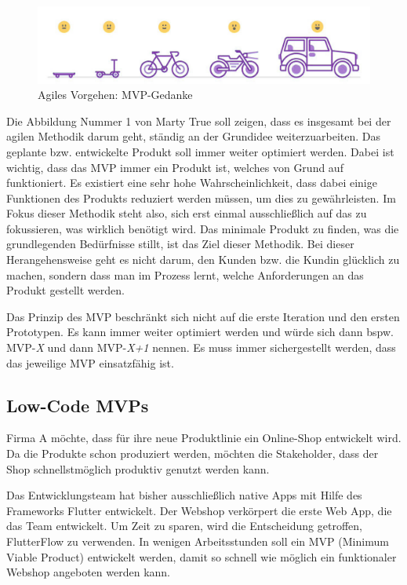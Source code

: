 \documentclass[acmtog, language=ngerman]{acmart}
\begin{document}
\begin{figure}[h]
    \centering
    \includegraphics[width=1\linewidth]{images/mvp_grafik.jpg}
    \caption{Agiles Vorgehen: MVP-Gedanke \cite{mvp_definition}}
    \label{fig:enter-label}
\end{figure}
Die Abbildung Nummer 1 von Marty True \cite{mvp_definition} soll zeigen, dass es insgesamt bei der agilen Methodik darum geht, ständig an der Grundidee weiterzuarbeiten. Das geplante bzw. entwickelte Produkt soll immer weiter optimiert werden.
Dabei ist wichtig, dass das MVP immer ein Produkt ist, welches von Grund auf funktioniert. Es existiert eine sehr hohe Wahrscheinlichkeit, dass dabei einige Funktionen des Produkts reduziert werden müssen, um dies zu gewährleisten.
Im Fokus dieser Methodik steht also, sich erst einmal ausschließlich auf das zu fokussieren, was wirklich benötigt wird. Das minimale Produkt zu finden, was die grundlegenden Bedürfnisse stillt, ist das Ziel dieser Methodik.
Bei dieser Herangehensweise geht es nicht darum, den Kunden bzw. die Kundin  glücklich zu machen, sondern dass man im Prozess lernt, welche Anforderungen an das Produkt gestellt werden.

Das Prinzip des MVP beschränkt sich nicht auf die erste Iteration und den ersten Prototypen. Es kann immer weiter optimiert werden und würde sich dann bspw. MVP-\textit{X} und dann MVP-\textit{X+1} nennen. Es muss immer sichergestellt werden, dass das jeweilige MVP einsatzfähig ist.

\subsection{Low-Code MVPs}

Firma A möchte, dass für ihre neue Produktlinie ein Online-Shop entwickelt wird. Da die Produkte schon produziert werden, möchten die Stakeholder, dass der Shop schnellstmöglich produktiv genutzt werden kann.

Das Entwicklungsteam hat bisher ausschließlich native Apps mit Hilfe des Frameworks Flutter entwickelt. Der Webshop verkörpert die erste Web App, die das Team entwickelt. Um Zeit zu sparen, wird die Entscheidung getroffen, FlutterFlow zu verwenden. In wenigen Arbeitsstunden soll ein MVP (Minimum Viable Product) entwickelt werden, damit so schnell wie möglich ein funktionaler Webshop angeboten werden kann.
\end{document}
